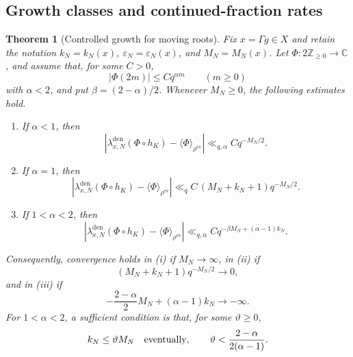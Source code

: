 \documentclass[11pt]{amsart}
\theoremstyle{definition}
\theoremstyle{plain}
\newtheorem{theorem}[definition]{Theorem}
\newcommand{\ZZ}{\mathbb Z}
\newcommand{\CC}{\mathbb C}
\newcommand{\ev}{\mathrm{ev}}
\newcommand{\ang}{\langle}
\newcommand{\rang}{\rangle}
\begin{document}
\subsection{Growth classes and continued-fraction rates}
\begin{theorem}[Controlled growth for moving roots]
\label{thm:dense-growth}
Fix \(x=\Gamma g\in X\) and retain the notation
\(k_N=k_N(x)\), \(\varepsilon_N=\varepsilon_N(x)\), and \(M_N=M_N(x)\).
Let \(\Phi:2\ZZ_{\ge0}\to\CC\), and assume that, for some \(C>0\),
\[
|\Phi(2m)|\le Cq^{\alpha m}\qquad(m\ge0)
\]
with \(\alpha<2\), and put \(\beta=(2-\alpha)/2\).  Whenever \(M_N\ge0\), the
following estimates hold.
\begin{enumerate}[label=(\roman*)]
\item If \(\alpha<1\), then
\[
\left|\lambda_{x,N}^{\mathrm{den}}(\Phi\circ h_K)
       -\ang\Phi\rang_{\rho^{\ev}}\right|
 \ll_{q,\alpha}Cq^{-M_N/2}.
\]
\item If \(\alpha=1\), then
\[
\left|\lambda_{x,N}^{\mathrm{den}}(\Phi\circ h_K)
       -\ang\Phi\rang_{\rho^{\ev}}\right|
 \ll_q C\,(M_N+k_N+1)q^{-M_N/2}.
\]
\item If \(1<\alpha<2\), then
\[
\left|\lambda_{x,N}^{\mathrm{den}}(\Phi\circ h_K)
       -\ang\Phi\rang_{\rho^{\ev}}\right|
 \ll_{q,\alpha}Cq^{-\beta M_N+(\alpha-1)k_N}.
\]
\end{enumerate}
Consequently, convergence holds in (i) if \(M_N\to\infty\), in (ii) if
\[
(M_N+k_N+1)q^{-M_N/2}\to0,
\]
and in (iii) if
\[
-\frac{2-\alpha}{2}M_N+(\alpha-1)k_N\to-\infty.
\]
For \(1<\alpha<2\), a sufficient condition is that, for some
\(\vartheta\ge0\),
\[
k_N\le\vartheta M_N\quad\hbox{eventually},\qquad
\vartheta<\frac{2-\alpha}{2(\alpha-1)}.
\]
\end{theorem}
\end{document}
